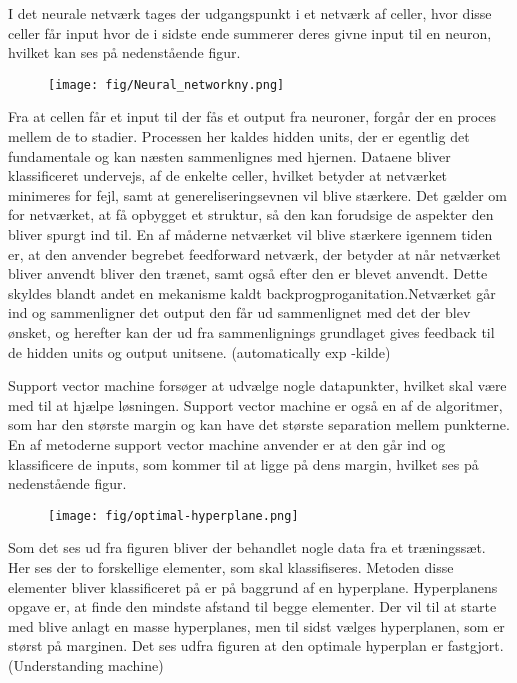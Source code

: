 I det neurale netværk tages der udgangspunkt i et netværk af celler, hvor disse celler får input hvor de i sidste ende summerer deres givne input til en neuron, hvilket kan ses på nedenstående figur.
\begin{figure}[H]	
\centering
\texttt{[image: fig/Neural\_networkny.png]}
\caption{ }
\label{fig:Neural netvaerk}
\end{figure}
Fra at cellen får et input til der fås et output fra neuroner, forgår der en proces mellem de to stadier. Processen her kaldes hidden units, der er egentlig det fundamentale og kan næsten sammenlignes med hjernen. Dataene bliver klassificeret undervejs, af de enkelte celler, hvilket betyder at netværket minimeres for fejl, samt at genereliseringsevnen vil blive stærkere. Det gælder om for netværket, at få opbygget et struktur, så den kan forudsige de aspekter den bliver spurgt ind til. \cite{DIKU2010} En af måderne netværket vil blive stærkere igennem tiden er, at den anvender begrebet feedforward netværk, der betyder at når netværket bliver anvendt bliver den trænet, samt også efter den er blevet anvendt. Dette skyldes blandt andet en mekanisme kaldt backprogproganitation.Netværket går ind og sammenligner det output den får ud sammenlignet med det der blev ønsket, og herefter kan der ud fra sammenlignings grundlaget gives feedback til de hidden units og output unitsene. (automatically exp -kilde) 

Support vector machine forsøger at udvælge nogle datapunkter, hvilket skal være med til at hjælpe løsningen. Support vector machine er også en af de algoritmer, som har den største margin og kan have det største separation mellem punkterne. En af metoderne support vector machine anvender er at den går ind og klassificere de inputs, som kommer til at ligge på dens margin, hvilket ses på nedenstående figur. 

\begin{figure}[H]	
\centering
\texttt{[image: fig/optimal-hyperplane.png]}
\caption{ }
\label{fig:Klassifikation af inputs}
\end{figure}  

Som det ses ud fra figuren bliver der behandlet nogle data fra et træningssæt. Her ses der to forskellige elementer, som skal klassifiseres. Metoden disse elementer bliver klassificeret på er på baggrund af en hyperplane. Hyperplanens opgave er, at finde den mindste afstand til begge elementer. Der vil til at starte med blive anlagt en masse hyperplanes, men til sidst vælges hyperplanen, som er størst på marginen. Det ses udfra figuren at den optimale hyperplan er fastgjort. (Understanding machine)  




